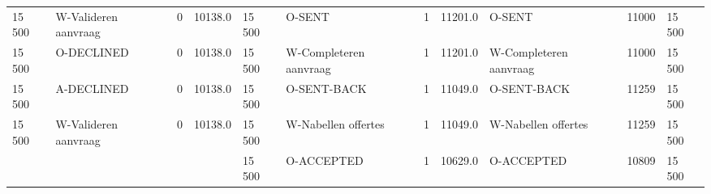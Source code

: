 \begin{tabular}{lllllllllll}
15 500 & W-Valideren aanvraag & 0 & 10138.0 & 15 500 & O-SENT & 1 & 11201.0 & O-SENT & 11000 & 15 500 \\
15 500 & O-DECLINED & 0 & 10138.0 & 15 500 & W-Completeren aanvraag & 1 & 11201.0 & W-Completeren aanvraag & 11000 & 15 500 \\
15 500 & A-DECLINED & 0 & 10138.0 & 15 500 & O-SENT-BACK & 1 & 11049.0 & O-SENT-BACK & 11259 & 15 500 \\
15 500 & W-Valideren aanvraag & 0 & 10138.0 & 15 500 & W-Nabellen offertes & 1 & 11049.0 & W-Nabellen offertes & 11259 & 15 500 \\
 &  &  &  & 15 500 & O-ACCEPTED & 1 & 10629.0 & O-ACCEPTED & 10809 & 15 500 \\
\bottomrule
\end{tabular}
